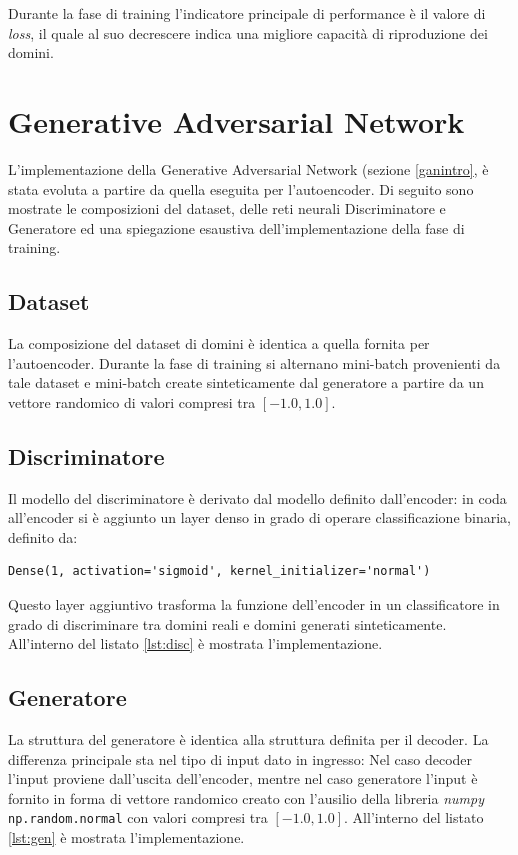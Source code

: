 Durante la fase di training l'indicatore principale di performance è il valore di \textit{loss}, il quale al suo decrescere indica una migliore capacità di riproduzione dei domini.

\newpage
\section{Generative Adversarial Network}
\label{imp:gan}
L'implementazione della Generative Adversarial Network (sezione \ref{ganintro}, è stata evoluta a partire da quella eseguita per l'autoencoder. Di seguito sono mostrate le composizioni del dataset, delle reti neurali Discriminatore e Generatore ed una spiegazione esaustiva dell'implementazione della fase di training.

\subsection{Dataset}
La composizione del dataset di domini è identica a quella fornita per l'autoencoder. Durante la fase di training si alternano mini-batch provenienti da tale dataset e mini-batch create sinteticamente dal generatore a partire da un vettore randomico di valori compresi tra $[-1.0,1.0]$.

\subsection{Discriminatore}
Il modello del discriminatore è derivato dal modello definito dall'encoder: in coda all'encoder si è aggiunto un layer denso in grado di operare classificazione binaria, definito da: 

\begin{lstlisting}
Dense(1, activation='sigmoid', kernel_initializer='normal')
\end{lstlisting}

Questo layer aggiuntivo trasforma la funzione dell'encoder in un classificatore in grado di discriminare tra domini reali e domini generati sinteticamente. All'interno del listato \ref{lst:disc} è mostrata l'implementazione.

\pagebreak 

\newpage
\subsection{Generatore}
La struttura del generatore è identica alla struttura definita per il decoder. La differenza principale sta nel tipo di input dato in ingresso: Nel caso decoder l'input proviene dall'uscita dell'encoder, mentre nel caso generatore l'input è fornito in forma di vettore randomico creato con l'ausilio della libreria \textit{numpy} \cite{numpy} \lstinline!np.random.normal! con valori compresi tra $[-1.0,1.0]$. All'interno del listato \ref{lst:gen} è mostrata l'implementazione.

